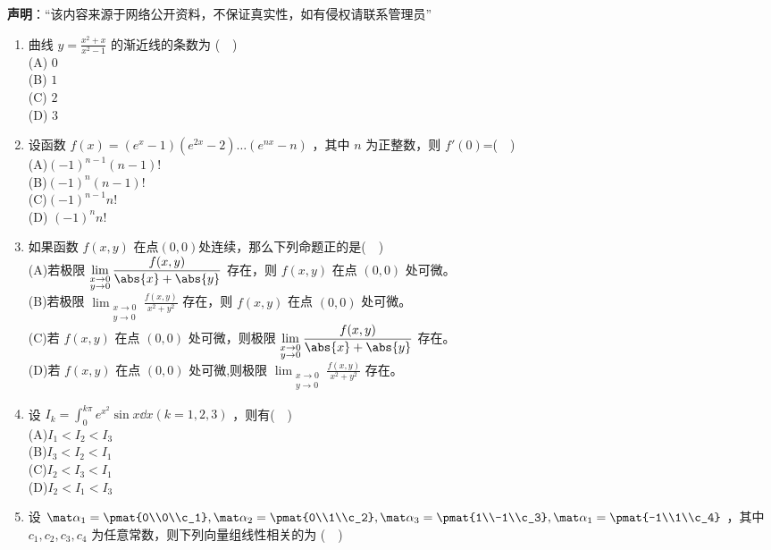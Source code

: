 
\textbf{声明}：“该内容来源于网络公开资料，不保证真实性，如有侵权请联系管理员”

\begin{enumerate}
\item 曲线 $\displaystyle y=\frac{x^2+x}{x^2-1}$ 的渐近线的条数为 ($\quad$)\\
(A) $0$\\
(B) $1$\\
(C) $2$\\
(D) $3$
\item 设函数 $f(x)=(e^x-1)(e^{2x}-2)\dots(e^{nx}-n)$ ，其中 $n$ 为正整数，则 $f'(0)$=($\quad$)\\
(A)$(-1)^{n-1}(n-1)!$\\
(B)$(-1)^n(n-1)!$\\
(C)$(-1)^{n-1}n!$\\
(D) $(-1)^n n!$
\item 如果函数 $f(x,y)$ 在点$ (0,0) $处连续，那么下列命题正的是($\quad$)\\
(A)若极限 $\displaystyle \lim_{\substack {x\to0 \\ y\to 0}}\frac{f(x,y)}{\abs{x}+\abs{y}}$ 存在，则 $f(x,y)$ 在点  $(0,0)$ 处可微。\\
(B)若极限 $\displaystyle \lim_{\substack {x\to0 \\ y\to 0}}\frac{f(x,y)}{x^2+y^2}$ 存在，则 $f(x,y)$ 在点  $(0,0)$ 处可微。\\
(C)若 $f(x,y)$ 在点  $(0,0)$ 处可微，则极限 $\displaystyle \lim_{\substack {x\to0 \\ y\to 0}}\frac{f(x,y)}{\abs{x}+\abs{y}}$ 存在。\\
(D)若 $f(x,y)$ 在点  $(0,0)$ 处可微,则极限 $\displaystyle \lim_{\substack {x\to0 \\ y\to 0}}\frac{f(x,y)}{x^2+y^2}$ 存在。
\item 设 $\displaystyle I_k=\int_{0}^{k\pi} e^{x^2}\sin x\dd{x}(k=1,2,3) $ ，则有($\quad$)\\
(A)$I_1<I_2<I_3$\\
(B)$I_3<I_2<I_1$\\
(C)$I_2<I_3<I_1$\\
(D)$I_2<I_1<I_3$
\item  设 $\mat \alpha_1=\pmat{0\\0\\c_1},\mat \alpha_2=\pmat{0\\1\\c_2},\mat \alpha_3=\pmat{1\\-1\\c_3},\mat \alpha_1=\pmat{-1\\1\\c_4}$ ，其中 $c_1,c_2,c_3,c_4$ 为任意常数，则下列向量组线性相关的为 ($\quad$)\\

\end{enumerate}
